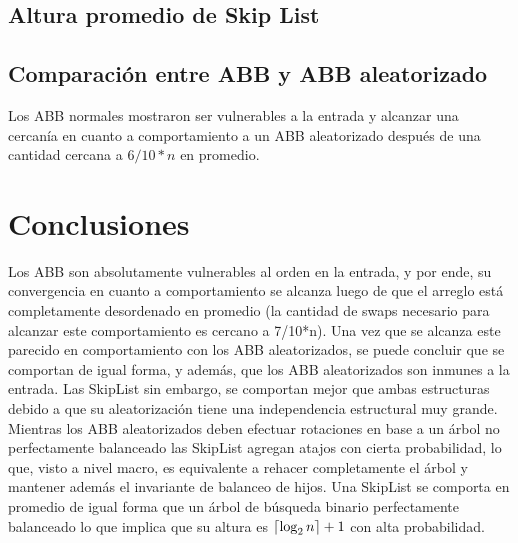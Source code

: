 \documentclass[12pt,letterpaper]{article}
\DeclarePairedDelimiter{\ceil}{\lceil}{\rceil}
\def \altura {\ceil{\log_2 n} +1}
\begin{document}
\subsection{Altura promedio de Skip List}

\subsection{Comparación entre ABB y ABB aleatorizado}
Los ABB normales mostraron ser vulnerables a la entrada y alcanzar una cercanía en cuanto a comportamiento a un ABB aleatorizado después de una cantidad cercana a $6/10*n$ en promedio.

\section{Conclusiones}
Los ABB son absolutamente vulnerables al orden en la entrada, y por ende, su convergencia en cuanto a comportamiento se alcanza luego de que el arreglo está completamente desordenado en promedio (la cantidad de swaps necesario para alcanzar este comportamiento es cercano a 7/10*n). Una vez que se alcanza este parecido en comportamiento con los ABB aleatorizados, se puede concluir que se comportan de igual forma, y además, que los ABB aleatorizados son inmunes a la entrada. Las SkipList sin embargo, se comportan mejor que ambas estructuras debido a que su aleatorización tiene una independencia estructural muy grande. Mientras los ABB aleatorizados deben efectuar rotaciones en base a un árbol no perfectamente balanceado las SkipList agregan atajos con cierta probabilidad, lo que, visto a nivel macro, es equivalente a rehacer completamente el árbol y mantener además el invariante de balanceo de hijos. Una SkipList se comporta en promedio de igual forma que un árbol de búsqueda binario perfectamente balanceado lo que implica que su altura es $\altura$ con alta probabilidad.

\end{document}
